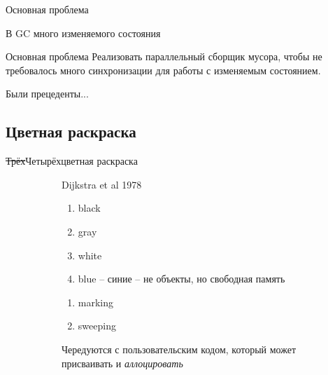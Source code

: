 \documentclass[aspectratio=169
  , xcolor={svgnames} 
  , hyperref={ colorlinks,citecolor=DeepPink4
             , linkcolor=DarkRed,urlcolor=DarkBlue}
  , russian
  ]{beamer}
\theoremstyle{exerciseStyle1}
\begin{document}
\begin{frame}{Основная проблема}

В GC много изменяемого состояния\vspace{.5cm}

\begin{block}{Основная проблема}
Реализовать параллельный сборщик мусора, чтобы не требовалось много синхронизации для работы с изменяемым состоянием.
\end{block}
Были прецеденты...
\end{frame}


\subsection{Цветная раскраска}

\begin{frame}{\sout{Трёх}Четырёхцветная раскраска}
\begin{figure}[ht]
\begin{subfigure}{.49\textwidth}
Dijkstra et al 1978
\begin{enumerate}
\item black
\item gray 
\item white
\item blue --  синие -- не объекты, но свободная память
\end{enumerate}
\end{subfigure}
\begin{subfigure}{.49\textwidth}
\begin{enumerate}
\item marking \item sweeping
\end{enumerate}
Чередуются с пользовательским кодом, который может присваивать и \textit{аллоцировать}
\end{subfigure}
\end{figure}

\end{frame}
\end{document}
